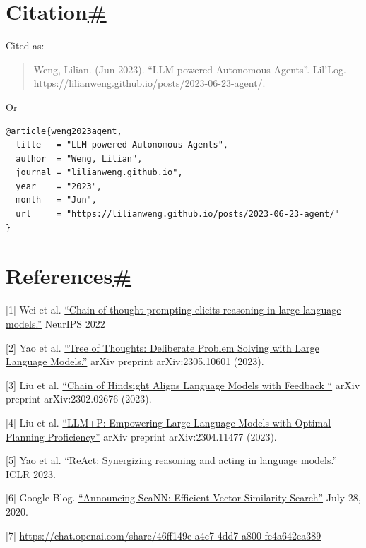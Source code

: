 \section{\texorpdfstring{Citation\hyperref[citation]{\#}}{Citation\#}}\label{citation}

Cited as:

\begin{quote}
Weng, Lilian. (Jun 2023). ``LLM-powered Autonomous Agents''. Lil'Log. https://lilianweng.github.io/posts/2023-06-23-agent/.
\end{quote}

Or

\begin{verbatim}
@article{weng2023agent,
  title   = "LLM-powered Autonomous Agents",
  author  = "Weng, Lilian",
  journal = "lilianweng.github.io",
  year    = "2023",
  month   = "Jun",
  url     = "https://lilianweng.github.io/posts/2023-06-23-agent/"
}
\end{verbatim}

\section{\texorpdfstring{References\hyperref[references]{\#}}{References\#}}\label{references}

{[}1{]} Wei et al. \href{https://arxiv.org/abs/2201.11903}{``Chain of thought prompting elicits reasoning in large language models.''} NeurIPS 2022

{[}2{]} Yao et al. \href{https://arxiv.org/abs/2305.10601}{``Tree of Thoughts: Deliberate Problem Solving with Large Language Models.''} arXiv preprint arXiv:2305.10601 (2023).

{[}3{]} Liu et al. \href{https://arxiv.org/abs/2302.02676}{``Chain of Hindsight Aligns Language Models with Feedback ``} arXiv preprint arXiv:2302.02676 (2023).

{[}4{]} Liu et al. \href{https://arxiv.org/abs/2304.11477}{``LLM+P: Empowering Large Language Models with Optimal Planning Proficiency''} arXiv preprint arXiv:2304.11477 (2023).

{[}5{]} Yao et al. \href{https://arxiv.org/abs/2210.03629}{``ReAct: Synergizing reasoning and acting in language models.''} ICLR 2023.

{[}6{]} Google Blog. \href{https://ai.googleblog.com/2020/07/announcing-scann-efficient-vector.html}{``Announcing ScaNN: Efficient Vector Similarity Search''} July 28, 2020.

{[}7{]} \url{https://chat.openai.com/share/46ff149e-a4c7-4dd7-a800-fc4a642ea389}

